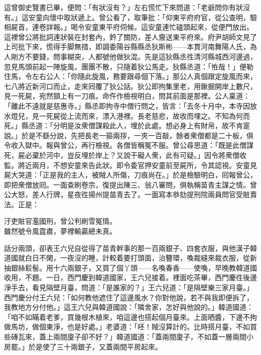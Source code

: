 這曾御史覽書已畢，便問：「有狀沒有？」左右慌忙下來問道：「老爺問你有狀沒有。」這安童向懷中取狀遞上。曾公看了，取筆批：「仰東平府府官，從公查明，驗相屍首，連卷詳報。」喝令安童東平府伺候。這安童連忙磕頭起來，從便門放出。這裡曾公將批詞連狀裝在封套內，鈐了關防，差人齎送東平府來。府尹胡師文見了上司批下來，慌得手脚無措，即調委陽谷縣縣丞狄斯彬——本貫河南舞陽人氏，為人剛方不要錢，問事糊突，人都號他做狄混。先是這狄縣丞徃清河縣城西河邊過，忽見馬頭前起一陣旋風，團團不散，只隨着狄公馬走。狄縣丞道：「恠哉！」便勒住馬，令左右公人：「你隨此旋風，務要跟尋個下落。」{}那公人真個跟定旋風而來，七八將近新河口而止，走來囘覆了狄公話。狄公即拘集里老，用鍬掘開岸上數尺，見一死屍，宛然頸上有一刀痕。命仵作檢視明白，問其前面是那裡。公人稟道：「離此不遠就是慈惠寺。」縣丞即拘寺中僧行問之，皆言：「去冬十月中，本寺因放水燈兒，見一死屍從上流而來，漂入港裡。長老慈悲，故收而埋之。不知為何而死。」縣丞道：「分明是汝衆僧謀殺此人，埋於此處。想必身上有財帛，故不肯寔說。」於是不繇分說，先把長老一箍兩拶，一夾一百敲，餘者衆僧都是二十板，{}俱令收入獄中。報與曾公，再行檢視。各僧皆稱冤不服。曾公尋思道：「既是此僧謀死，屍必棄於河中，豈反埋於岸上？又說干礙人衆，此有可疑。」因令將衆僧收監。將近兩月，不想安童來告此狀。即令委官押安童前至屍所，令其認視。安童見屍大哭道：「正是我的主人，被賊人所傷，刀痕尚在。」於是檢驗明白，囘報曾公，即把衆僧放囘。一面查刷卷宗，復提出陳三、翁八審問，俱執稱苗青主謀之情。曾公大怒，差人行牌，星夜徃揚州提苗青去了。一面寫本叅劾提刑院兩員問官受賍賣法。正是：

\begin{myquote}
汙吏賍官濫國刑，曾公判刷雪冤情。\\雖然號令風霆肅，夢裡輸贏總未真。
\end{myquote}

話分兩頭，卻表王六兒自從得了苗青幹事的那一百兩銀子、四套衣服，與他漢子韓道國就白日不閑，一夜沒的睡，計較着要打頭面，治簪環，喚裁縫來裁衣服，從新抽銀絲鬏髻。用十六兩銀子，又買了個丫頭——名喚春香——使喚，早晚教韓道國收用，不題。{}一日，西門慶到韓道國家，王六兒接着。裡面吃茶畢，西門慶徃後邊淨手去，看見隔壁月臺，問道：「是誰家的？」王六兒道：「是隔壁樂三家月臺。」西門慶分付王六兒：「如何教他遮住了這邊風水？你對他說，若不與我即便拆了，我教地方分付他。」這王六兒與韓道國說：「隣舍家，怎好與他說的。」韓道國道：「咱不如瞞着老爹，買幾根木植來，咱這邊也搭起個月臺來。上面晒醬，下邊不拘做馬坊，做個東淨，也是好處。」老婆道：「呸！賊沒算計的。比時搭月臺，不如買些磚瓦來，蓋上兩間廈子卻不好？」韓道國道：「蓋兩間廈子，不如蓋一層兩間小房罷。」於是使了三十兩銀子，又蓋兩間平房起來。


